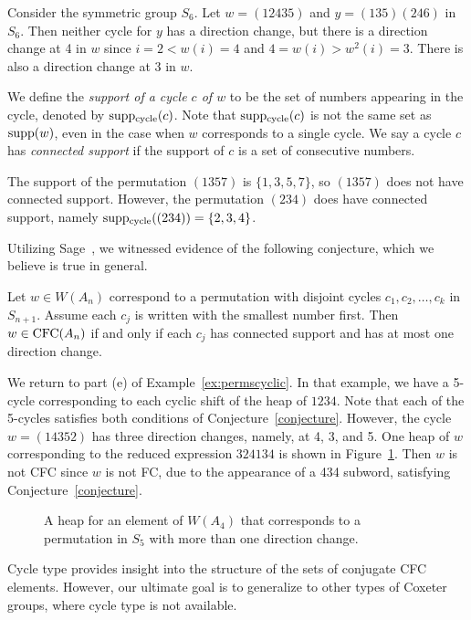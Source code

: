 \begin{example} Consider the symmetric group $S_6$. Let $w = (12435)$ and $y = (135)(246)$ in $S_6$. Then neither cycle for $y$ has a direction change, but there is a direction change at 4 in $w$ since $i = 2 < w(i) = 4$ and $4 = w(i) > w^2(i) = 3$. There is also a direction change at 3 in $w$.
\end{example}

    We define the \emph{support of a cycle $c$ of $w$} to be the set of numbers appearing in the cycle, denoted by $\operatorname{supp_{cycle}}(c)$.
    Note that $\operatorname{supp_{cycle}}(c)$ is not the same set as $\operatorname{supp}(w)$, even in the case when $w$ corresponds to a single cycle.
    We say a cycle $c$ has \emph{connected support} if the support of $c$ is a set of consecutive numbers.

\begin{example} The support of the permutation $(1357)$ is $\{1,3,5,7\}$, so $(1357)$ does not have connected support. However, the permutation $(234)$ does have connected support, namely $\operatorname{supp_{cycle}}((234)) = \{2,3,4\}$.
\end{example}

    Utilizing Sage~\cite{sage}, we witnessed evidence of the following conjecture, which we believe is true in general.

\begin{conjecture}\label{conjecture}
Let $w \in W(A_n)$ correspond to a permutation with disjoint cycles $c_1, c_2, \ldots, c_k$ in $S_{n+1}$. Assume each $c_j$ is written with the smallest number first.
    Then $w \in \operatorname{\mathrm{CFC}}(A_n)$ if and only if each $c_j$ has connected support and has at most one direction change.
\end{conjecture}

\begin{example} We return to part (e) of Example~\ref{ex:permscyclic}. In that example, we have a 5-cycle corresponding to each cyclic shift of the heap of $1234$.
    Note that each of the 5-cycles satisfies both conditions of Conjecture~\ref{conjecture}.
    However, the cycle $w = (14352)$ has three direction changes, namely, at 4, 3, and 5. 
    One heap of $w$ corresponding to the reduced expression $324134$ is shown in Figure~\ref{fig:dirchangeheap}. Then $w$ is not CFC since $w$ is not FC, due to the appearance of a 434 subword, satisfying Conjecture~\ref{conjecture}.
\begin{center} \begin{figure}[H] \centering
{}
\caption{A heap for an element of $W(A_4)$ that corresponds to a permutation in $S_5$ with more than one direction change.}\label{fig:dirchangeheap}
\end{figure} \end{center}
\end{example}
    
    Cycle type provides insight into the structure of the sets of conjugate CFC elements. However, our ultimate goal is to generalize to other types of Coxeter groups, where cycle type is not available.


